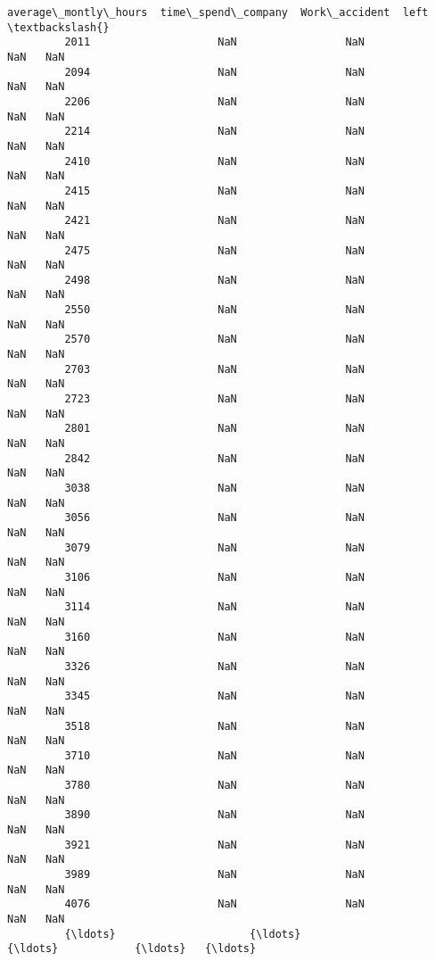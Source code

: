 \documentclass[11pt]{article}
\begin{document}
\begin{Verbatim}[commandchars=\\\{\}]
                average\_montly\_hours  time\_spend\_company  Work\_accident  left  \textbackslash{}
         2011                    NaN                 NaN            NaN   NaN   
         2094                    NaN                 NaN            NaN   NaN   
         2206                    NaN                 NaN            NaN   NaN   
         2214                    NaN                 NaN            NaN   NaN   
         2410                    NaN                 NaN            NaN   NaN   
         2415                    NaN                 NaN            NaN   NaN   
         2421                    NaN                 NaN            NaN   NaN   
         2475                    NaN                 NaN            NaN   NaN   
         2498                    NaN                 NaN            NaN   NaN   
         2550                    NaN                 NaN            NaN   NaN   
         2570                    NaN                 NaN            NaN   NaN   
         2703                    NaN                 NaN            NaN   NaN   
         2723                    NaN                 NaN            NaN   NaN   
         2801                    NaN                 NaN            NaN   NaN   
         2842                    NaN                 NaN            NaN   NaN   
         3038                    NaN                 NaN            NaN   NaN   
         3056                    NaN                 NaN            NaN   NaN   
         3079                    NaN                 NaN            NaN   NaN   
         3106                    NaN                 NaN            NaN   NaN   
         3114                    NaN                 NaN            NaN   NaN   
         3160                    NaN                 NaN            NaN   NaN   
         3326                    NaN                 NaN            NaN   NaN   
         3345                    NaN                 NaN            NaN   NaN   
         3518                    NaN                 NaN            NaN   NaN   
         3710                    NaN                 NaN            NaN   NaN   
         3780                    NaN                 NaN            NaN   NaN   
         3890                    NaN                 NaN            NaN   NaN   
         3921                    NaN                 NaN            NaN   NaN   
         3989                    NaN                 NaN            NaN   NaN   
         4076                    NaN                 NaN            NaN   NaN   
         {\ldots}                     {\ldots}                 {\ldots}            {\ldots}   {\ldots}   

\end{Verbatim}
\end{document}
